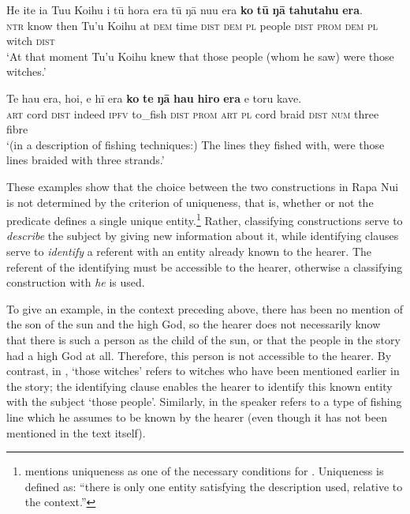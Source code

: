 \ea\label{ex:9.23}
\gll He {\ꞌ}ite ia Tu{\ꞌ}u Koihu {\ꞌ}i tū hora era tū ŋā nu{\ꞌ}u era  \textbf{ko} \textbf{tū} \textbf{ŋā} \textbf{tahutahu} \textbf{era}.\\
\textsc{ntr} know then Tu’u Koihu at \textsc{dem} time \textsc{dist} \textsc{dem} \textsc{pl} people \textsc{dist}  \textsc{prom} \textsc{dem} \textsc{pl} witch \textsc{dist}\\

\glt 
‘At that moment Tu’u Koihu knew that those people (whom he saw) were those witches.’ \textstyleExampleref{[R233.023]} 
\z

\ea\label{ex:9.24}
\gll Te hau era, ho{\ꞌ}i, e hī era \textbf{ko} \textbf{te} \textbf{ŋā} \textbf{hau} \textbf{hiro} \textbf{era} e toru kave. \\
\textsc{art} cord \textsc{dist} indeed \textsc{ipfv} to\_fish \textsc{dist} \textsc{prom} \textsc{art} \textsc{pl} cord braid \textsc{dist} \textsc{num} three fibre \\

\glt
‘(in a description of fishing techniques:) The lines they fished with, were those lines braided with three strands.’ \textstyleExampleref{[R539-1.218]}
\z

These examples show that the choice between the two constructions in Rapa Nui is not determined by the criterion of uniqueness, that is, whether or not the predicate defines a single unique entity.\footnote{\label{fn:465}\citet{Lyons1999} mentions uniqueness as one of the necessary conditions for . Uniqueness is defined as: “there is only one entity satisfying the description used, relative to the context.”} Rather, classifying constructions serve to \textit{describe} the subject by giving new information about it, while identifying clauses serve to \textit{identify} a referent with an entity already known to the hearer. The referent of the identifying  must be accessible to the hearer, otherwise a classifying construction with \textit{he} is used.

To give an example, in the context preceding  above, there has been no mention of the son of the sun and the high God, so the hearer does not necessarily know that there is such a person as the child of the sun, or that the people in the story had a high God at all. Therefore, this person is not accessible to the hearer. By contrast, in , ‘those witches’ refers to witches who have been mentioned earlier in the story; the identifying clause enables the hearer to identify this known entity with the subject ‘those people’. Similarly, in  the speaker refers to a type of fishing line which he assumes to be known by the hearer (even though it has not been mentioned in the text itself).

